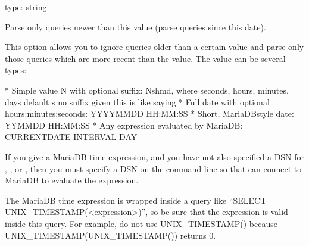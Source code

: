 \documentclass[letterpaper,10pt,english]{sphinxmanual}
\begin{document}
\begin{fulllineitems}
\label{\detokenize{mariadb-query-digest:cmdoption-mariadb-query-digest-since}}
\sphinxAtStartPar
type: string

\sphinxAtStartPar
Parse only queries newer than this value (parse queries since this date).

\sphinxAtStartPar
This option allows you to ignore queries older than a certain value and parse
only those queries which are more recent than the value.  The value can be
several types:

\begin{sphinxVerbatim}[commandchars=\\\{\}]
* Simple  value N with optional suffix: N\PYG{o}{[}shmd\PYG{o}{]}, where
  seconds, hours, minutes, days default s  no suffix
  given this is like saying 
* Full date with optional hours:minutes:seconds:
  YYYY\PYGZhy{}MM\PYGZhy{}DD \PYG{o}{[}HH:MM:SS\PYG{o}{]}
* Short, MariaDB\PYGZhy{}style date:
  YYMMDD \PYG{o}{[}HH:MM:SS\PYG{o}{]}
* Any  expression evaluated by MariaDB:
  CURRENT\PYGZus{}DATE \PYGZhy{} INTERVAL  DAY
\end{sphinxVerbatim}

\sphinxAtStartPar
If you give a MariaDB time expression, and you have not also specified a DSN
for {\hyperref[\detokenize{mariadb-query-digest:cmdoption-mariadb-query-digest-explain}]{}}, {\hyperref[\detokenize{mariadb-query-digest:cmdoption-mariadb-query-digest-processlist}]{}}, or {\hyperref[\detokenize{mariadb-query-digest:cmdoption-mariadb-query-digest-review}]{}}, then you must specify
a DSN on the command line so that  can connect to MariaDB to
evaluate the expression.

\sphinxAtStartPar
The MariaDB time expression is wrapped inside a query like
“SELECT UNIX\_TIMESTAMP(\textless{}expression\textgreater{})”, so be sure that the expression is
valid inside this query.  For example, do not use UNIX\_TIMESTAMP() because
UNIX\_TIMESTAMP(UNIX\_TIMESTAMP()) returns 0.


\end{fulllineitems}
\end{document}
